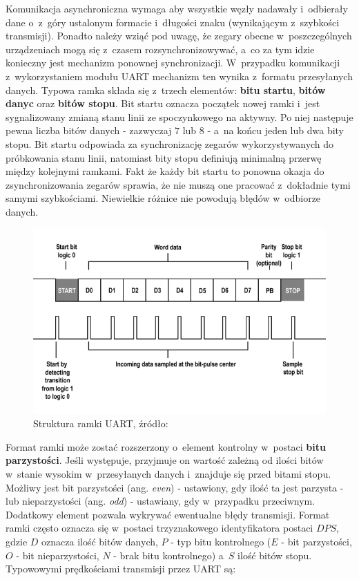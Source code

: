 Komunikacja asynchroniczna wymaga aby wszystkie węzły nadawały i~odbierały dane o~z~góry ustalonym formacie i~długości znaku (wynikającym z~szybkości transmisji). Ponadto należy wziąć pod uwagę, że zegary obecne w~poszczególnych urządzeniach mogą się z~czasem rozsynchronizowywać, a~co za tym idzie konieczny jest mechanizm ponownej synchronizacji. W~przypadku komunikacji z~wykorzystaniem modułu UART mechanizm ten wynika z~formatu przesyłanych danych. Typowa ramka składa się z~trzech elementów: \textbf{bitu startu}, \textbf{bitów danyc} oraz \textbf{bitów stopu}. Bit startu oznacza początek nowej ramki i~jest sygnalizowany zmianą stanu linii ze spoczynkowego na aktywny. Po niej następuje pewna liczba bitów danych - zazwyczaj $7$ lub $8$  - a~na końcu jeden lub dwa bity stopu. Bit startu odpowiada za synchronizację zegarów wykorzystywanych do próbkowania stanu linii, natomiast bity stopu definiują minimalną przerwę między kolejnymi ramkami. Fakt że każdy bit startu to ponowna okazja do zsynchronizowania zegarów sprawia, że nie muszą one pracować z~dokładnie tymi samymi szybkościami. Niewielkie różnice nie powodują błędów w~odbiorze danych.

\begin{figure}[ht]
    \centering
    \includegraphics[scale=0.5]{img/uart_frame.png}
    \captionsetup{format=plain,justification=centering}
    \caption{Struktura ramki UART, źródło: \cite{uart_frame}}
    \label{uart-frame}
\end{figure}

Format ramki może zostać rozszerzony o~element kontrolny w~postaci \textbf{bitu parzystości}. Jeśli występuje, przyjmuje on wartość zależną od ilości bitów w~stanie wysokim w~przesyłanych danych i~znajduje się przed bitami stopu. Możliwy jest bit parzystości (ang. \textit{even}) - ustawiony, gdy ilość ta jest parzysta - lub nieparzystości (ang. \textit{odd}) - ustawiany, gdy w~przypadku przeciwnym. Dodatkowy element pozwala wykrywać ewentualne błędy transmisji. Format ramki często oznacza się w~postaci trzyznakowego identyfikatora postaci $DPS$, gdzie $D$ oznacza ilość bitów danych, $P$ - typ bitu kontrolnego ($E$ - bit parzystości, $O$ - bit nieparzystości, $N$ - brak bitu kontrolnego) a~$S$ ilość bitów stopu. Typowowymi prędkościami transmisji przez UART są:

